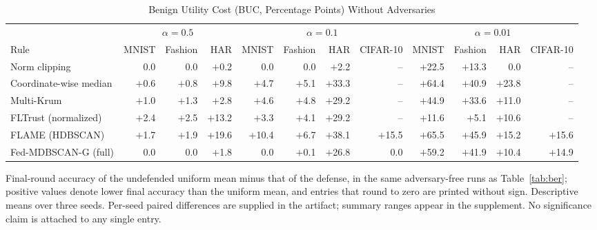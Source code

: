 \begin{table}[!tp]
\centering\footnotesize
\setlength{\tabcolsep}{4pt}
\caption{Benign Utility Cost (BUC, Percentage Points) Without Adversaries}\label{tab:buc}
\begin{adjustbox}{max width=\textwidth}
\begin{tabular}{lrrrrrrrrrrr}
\toprule
& \multicolumn{3}{c}{$\alpha=0.5$} & \multicolumn{4}{c}{$\alpha=0.1$} & \multicolumn{4}{c}{$\alpha=0.01$} \\
\cmidrule(lr){2-4}\cmidrule(lr){5-8}\cmidrule(lr){9-12}
Rule & MNIST & Fashion & HAR & MNIST & Fashion & HAR & CIFAR-10 & MNIST & Fashion & HAR & CIFAR-10 \\
\midrule
Norm clipping & 0.0 & 0.0 & $+$0.2 & 0.0 & 0.0 & $+$2.2 & -- & $+$22.5 & $+$13.3 & 0.0 & -- \\
Coordinate-wise median & $+$0.6 & $+$0.8 & $+$9.8 & $+$4.7 & $+$5.1 & $+$33.3 & -- & $+$64.4 & $+$40.9 & $+$23.8 & -- \\
Multi-Krum & $+$1.0 & $+$1.3 & $+$2.8 & $+$4.6 & $+$4.8 & $+$29.2 & -- & $+$44.9 & $+$33.6 & $+$11.0 & -- \\
FLTrust (normalized) & $+$2.4 & $+$2.5 & $+$13.2 & $+$3.3 & $+$4.1 & $+$29.2 & -- & $+$11.6 & $+$5.1 & $+$10.6 & -- \\
FLAME (HDBSCAN) & $+$1.7 & $+$1.9 & $+$19.6 & $+$10.4 & $+$6.7 & $+$38.1 & $+$15.5 & $+$65.5 & $+$45.9 & $+$15.2 & $+$15.6 \\
Fed-MDBSCAN-G (full) & 0.0 & 0.0 & $+$1.8 & 0.0 & $+$0.1 & $+$26.8 & 0.0 & $+$59.2 & $+$41.9 & $+$10.4 & $+$14.9 \\
\bottomrule
\end{tabular}
\end{adjustbox}

\par\vspace{3pt}\parbox{\linewidth}{\footnotesize Final-round accuracy of the undefended uniform mean minus that of the defense, in the same adversary-free runs as Table~\ref{tab:ber}; positive values denote lower final accuracy than the uniform mean, and entries that round to zero are printed without sign. Descriptive means over three seeds. Per-seed paired differences are supplied in the artifact; summary ranges appear in the supplement. No significance claim is attached to any single entry.}
\end{table}
